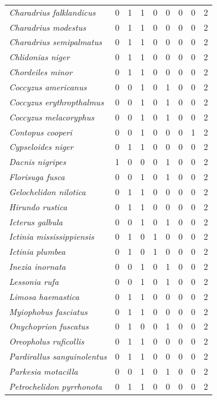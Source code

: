 \documentclass[
  oneside]{scrbook}
\begin{document}
\begin{ThreePartTable}
\begin{longtable}[t]{>{}lrrrrrlrl}
\addlinespace
\em{Charadrius falklandicus} & 0 & 1 & 1 & 0 & 0 & 0 & 0 & 2\\
\em{Charadrius modestus} & 0 & 1 & 1 & 0 & 0 & 0 & 0 & 2\\
\em{Charadrius semipalmatus} & 0 & 1 & 1 & 0 & 0 & 0 & 0 & 2\\
\em{Chlidonias niger} & 0 & 1 & 1 & 0 & 0 & 0 & 0 & 2\\
\em{Chordeiles minor} & 0 & 1 & 1 & 0 & 0 & 0 & 0 & 2\\
\addlinespace
\em{Coccyzus americanus} & 0 & 0 & 1 & 0 & 1 & 0 & 0 & 2\\
\em{Coccyzus erythropthalmus} & 0 & 0 & 1 & 0 & 1 & 0 & 0 & 2\\
\em{Coccyzus melacoryphus} & 0 & 0 & 1 & 0 & 1 & 0 & 0 & 2\\
\em{Contopus cooperi} & 0 & 0 & 1 & 0 & 0 & 0 & 1 & 2\\
\em{Cypseloides niger} & 0 & 1 & 1 & 0 & 0 & 0 & 0 & 2\\
\addlinespace
\em{Dacnis nigripes} & 1 & 0 & 0 & 0 & 1 & 0 & 0 & 2\\
\em{Florisuga fusca} & 0 & 0 & 1 & 0 & 1 & 0 & 0 & 2\\
\em{Gelochelidon nilotica} & 0 & 1 & 1 & 0 & 0 & 0 & 0 & 2\\
\em{Hirundo rustica} & 0 & 1 & 1 & 0 & 0 & 0 & 0 & 2\\
\em{Icterus galbula} & 0 & 0 & 1 & 0 & 1 & 0 & 0 & 2\\
\addlinespace
\em{Ictinia mississippiensis} & 0 & 1 & 0 & 1 & 0 & 0 & 0 & 2\\
\em{Ictinia plumbea} & 0 & 1 & 0 & 1 & 0 & 0 & 0 & 2\\
\em{Inezia inornata} & 0 & 0 & 1 & 0 & 1 & 0 & 0 & 2\\
\em{Lessonia rufa} & 0 & 0 & 1 & 0 & 1 & 0 & 0 & 2\\
\em{Limosa haemastica} & 0 & 1 & 1 & 0 & 0 & 0 & 0 & 2\\
\addlinespace
\em{Myiophobus fasciatus} & 0 & 1 & 1 & 0 & 0 & 0 & 0 & 2\\
\em{Onychoprion fuscatus} & 0 & 1 & 0 & 0 & 1 & 0 & 0 & 2\\
\em{Oreopholus ruficollis} & 0 & 1 & 1 & 0 & 0 & 0 & 0 & 2\\
\em{Pardirallus sanguinolentus} & 0 & 1 & 1 & 0 & 0 & 0 & 0 & 2\\
\em{Parkesia motacilla} & 0 & 0 & 1 & 0 & 1 & 0 & 0 & 2\\
\addlinespace
\em{Petrochelidon pyrrhonota} & 0 & 1 & 1 & 0 & 0 & 0 & 0 & 2\\

\end{longtable}
\end{ThreePartTable}
\end{document}

